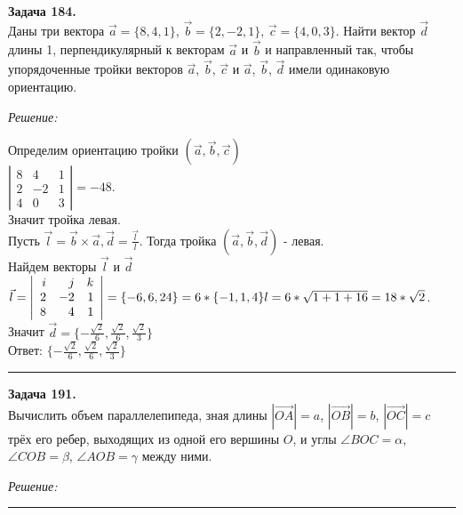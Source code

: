 \documentclass[a4paper, 12pt]{article}
\newenvironment{problem}[2][Задача]
    { \begin{mdframed}[backgroundcolor=gray!10] \textbf{#1 #2.} \\}
    {  \end{mdframed}}
\newenvironment{solution}
    {\textit{Решение: }}
    {\noindent\rule{7in}{1.5pt}}
\begin{document}
\begin{problem}{184}
Даны три вектора $\vec{a}=\{8,4,1\}$, $\vec{b}=\{2,-2,1\}$, $\vec{c}=\{4,0,3\}$.
Найти вектор $\vec d$ длины 1, перпендикулярный к векторам $\vec a$ и $\vec b$ и направленный так, чтобы упорядоченные
тройки векторов $\vec a$, $\vec b$, $\vec c$ и  $\vec a$, $\vec b$, $\vec d$ имели одинаковую ориентацию.
\end{problem}
\begin{solution}

Определим ориентацию тройки $(\vec{a}, \vec{b}, \vec{c})$ \\
$
\left|
  \begin{array}{rrr}
    8 & 4 & 1 \\
    2 & -2 & 1 \\
    4 & 0 & 3
  \end{array}
\right|
= -48
$. \\
Значит тройка левая. \\
Пусть
$
\vec{l} = \vec{b} \times \vec{a}, \vec{d} = \frac{\vec{l}}{l}
$.
Тогда тройка $(\vec{a}, \vec{b}, \vec{d})$ - левая. \\
Найдем векторы $\vec{l}$ и $\vec{d}$ \\
$
\vec{l} =
\left|
  \begin{array}{rrr}
    i & j & k \\
    2 & -2 & 1 \\
    8 & 4 & 1
  \end{array}
\right|
=
\{-6, 6, 24\} = 6 * \{-1, 1, 4\} \\
l = 6 * \sqrt{1 + 1 + 16} = 18 * \sqrt{2}
$. \\
Значит $\vec{d} = \{-\frac{\sqrt{2}}{6}, \frac{\sqrt{2}}{6}, \frac{\sqrt{2}}{3}\}$ \\
Ответ: $\{-\frac{\sqrt{2}}{6}, \frac{\sqrt{2}}{6}, \frac{\sqrt{2}}{3}\}$

\end{solution}

\begin{problem}{191}
Вычислить объем параллелепипеда, зная длины $|\overrightarrow{OA}|=a$, $|\overrightarrow{OB}|=b$, $|\overrightarrow{OC}|=c$
трёх его ребер, выходящих из одной его вершины $O$, и углы $\angle BOC=\alpha$, $\angle COB=\beta$, $\angle AOB=\gamma$ между ними.
\end{problem}
\begin{solution}


\end{solution}
\end{document}
